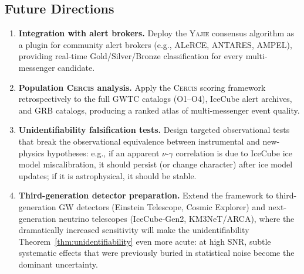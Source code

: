 \documentclass[11pt,a4paper]{article}
\theoremstyle{definition}
\newcommand{\Yajie}{\textsc{Yajie}}
\newcommand{\Cercis}{\textsc{Cercis}}
\begin{document}
\subsection{Future Directions}
\begin{enumerate}[label=(\roman*)]
    \item \textbf{Integration with alert brokers.} Deploy the \Yajie{} consensus algorithm as a plugin for community alert brokers (e.g., ALeRCE, ANTARES, AMPEL), providing real-time Gold/Silver/Bronze classification for every multi-messenger candidate.
    \item \textbf{Population \Cercis{} analysis.} Apply the \Cercis{} scoring framework retrospectively to the full GWTC catalogs (O1--O4), IceCube alert archives, and GRB catalogs, producing a ranked atlas of multi-messenger event quality.
    \item \textbf{Unidentifiability falsification tests.} Design targeted observational tests that break the observational equivalence between instrumental and new-physics hypotheses: e.g., if an apparent $\nu$-$\gamma$ correlation is due to IceCube ice model miscalibration, it should persist (or change character) after ice model updates; if it is astrophysical, it should be stable.
    \item \textbf{Third-generation detector preparation.} Extend the framework to third-generation GW detectors (Einstein Telescope, Cosmic Explorer) and next-generation neutrino telescopes (IceCube-Gen2, KM3NeT/ARCA), where the dramatically increased sensitivity will make the unidentifiability Theorem~\ref{thm:unidentifiability} even more acute: at high SNR, subtle systematic effects that were previously buried in statistical noise become the dominant uncertainty.
\end{enumerate}
\end{document}
